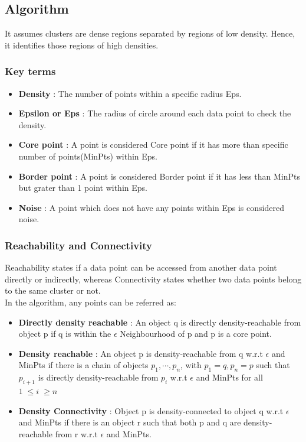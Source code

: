 \documentclass[12pt,letterpaper, onecolumn]{exam}
\begin{document}
\subsection*{Algorithm}
It assumes clusters are dense regions separated by regions of low density. Hence, it identifies those regions of high densities.
\subsubsection*{Key terms}
\begin{itemize}
\item \textbf{Density} : The number of points within a specific radius Eps.
\item \textbf{Epsilon or Eps} : The radius of circle around each data point to check the density.
\item \textbf{Core point} : A point is considered Core point if it has more than specific number of points(MinPts) within Eps.
\item \textbf{Border point} : A point is considered Border point if it has less than MinPts but grater than 1 point within Eps.
\item \textbf{Noise} : A point which does not have any points within Eps is considered noise.
\end{itemize}

\subsubsection*{Reachability and Connectivity}
Reachability states if a data point can be accessed from another data point directly or indirectly, whereas Connectivity states whether two data points belong to the same cluster or not.
\\In the algorithm, any points can be referred as:
\begin{itemize}
\item \textbf{Directly density reachable} : An object q is directly density-reachable from object p if q is within the $\epsilon$ Neighbourhood of p and p is a core point.
\item \textbf{Density reachable} :  An object p is density-reachable from q w.r.t $\epsilon$ and MinPts if there is a chain 
of objects $p_1,\cdots,p_n$, with $p_1 = q, p_n
= p$ such that $p_{i+1}$ is directly density-reachable 
from $p_i$ w.r.t $\epsilon$ and MinPts for all $1 \; \leq i \; \geq n$
\item \textbf{Density Connectivity} : Object p is density-connected to object q w.r.t $\epsilon$ and MinPts if there is an 
object r such that both p and q are density-reachable from r w.r.t $\epsilon$ and MinPts.
\end{itemize}
\end{document}
